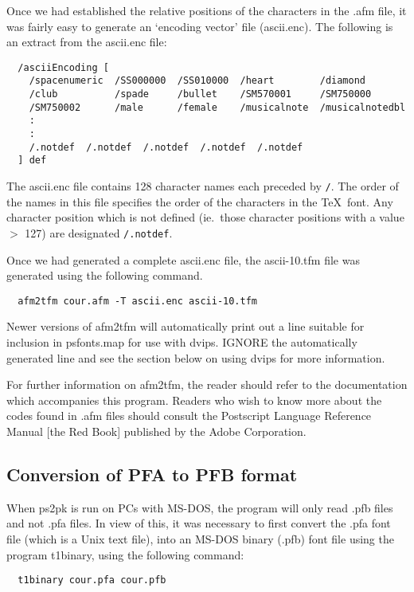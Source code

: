 Once we had established the relative positions of the characters in the
{\sc .afm} file, it was fairly easy to generate an `encoding vector'
file ({\sc ascii.enc}).
The following is an extract from the {\sc ascii.enc} file:
\begin{verbatim}
  /asciiEncoding [
    /spacenumeric  /SS000000  /SS010000  /heart        /diamond
    /club          /spade     /bullet    /SM570001     /SM750000
    /SM750002      /male      /female    /musicalnote  /musicalnotedbl
    :
    :
    /.notdef  /.notdef  /.notdef  /.notdef  /.notdef
  ] def
\end{verbatim}
The {\sc ascii.enc} file contains 128 character names each preceded by
\verb|/|. 
The order of the names in this file specifies
the order of the characters in the \TeX\ font.
Any character position which is not defined (ie.\ those character positions with a value 
$>$ 127) are designated \verb|/.notdef|. 

Once we had generated a complete {\sc ascii.enc} file,  the
 {\sc ascii-10.tfm} file  was generated  using the following command.
\begin{verbatim}
  afm2tfm cour.afm -T ascii.enc ascii-10.tfm
\end{verbatim}
Newer versions of {\sc afm2tfm} will automatically print out a line
suitable for inclusion in {\sc psfonts.map} for use with {\sc dvips}.
IGNORE the automatically generated line and see the section below on using
{\sc dvips} for more information.

For further information on {\sc afm2tfm}, the reader should refer to the
documentation which accompanies this program.
Readers who wish to know more about the codes found in {\sc .afm} files
 should consult the Postscript Language Reference Manual [the Red Book]
published by the Adobe Corporation.

\subsection{Conversion of PFA to PFB format}

When {\sc ps2pk} is run on PCs with MS-DOS, the program will only read
{\sc .pfb} files and not {\sc .pfa} files. In view of this, it was
necessary to first convert the {\sc .pfa} font file (which is a Unix
text file), into an  MS-DOS binary ({\sc .pfb}) font file using the
program {\sc t1binary}, using the following command:
\begin{verbatim}
  t1binary cour.pfa cour.pfb
\end{verbatim}



